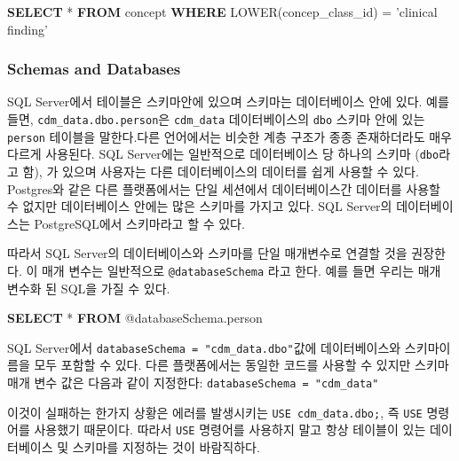 \documentclass[11pt]{book}
\newenvironment{Shaded}{\begin{snugshade}}{\end{snugshade}}
\newcommand{\KeywordTok}[1]{\textcolor[rgb]{0.13,0.29,0.53}{\textbf{#1}}}
\newcommand{\StringTok}[1]{\textcolor[rgb]{0.31,0.60,0.02}{#1}}
\newcommand{\FunctionTok}[1]{\textcolor[rgb]{0.00,0.00,0.00}{#1}}
\newcommand{\NormalTok}[1]{#1}
\theoremstyle{definition}
\theoremstyle{definition}
\theoremstyle{definition}
\theoremstyle{remark}
\begin{document}
\begin{Shaded}
\begin{Highlighting}[]
\KeywordTok{SELECT}\NormalTok{ * }\KeywordTok{FROM}\NormalTok{ concept }\KeywordTok{WHERE} \FunctionTok{LOWER}\NormalTok{(concep_class_id) = }\StringTok{'clinical finding'}
\end{Highlighting}
\end{Shaded}

\subsubsection*{Schemas and Databases}\label{schemas-and-databases}

SQL Server에서 테이블은 스키마안에 있으며 스키마는 데이터베이스 안에
있다. 예를 들면, \texttt{cdm\_data.dbo.person}은 \texttt{cdm\_data}
데이터베이스의 \texttt{dbo} 스키마 안에 있는 \texttt{person} 테이블을
말한다.다른 언어에서는 비슷한 계층 구조가 종종 존재하더라도 매우 다르게
사용된다. SQL Server에는 일반적으로 데이터베이스 당 하나의 스키마
(\texttt{dbo}라고 함), 가 있으며 사용자는 다른 데이터베이스의 데이터를
쉽게 사용할 수 있다. Postgres와 같은 다른 플랫폼에서는 단일 세션에서
데이터베이스간 데이터를 사용할 수 없지만 데이터베이스 안에는 많은
스키마를 가지고 있다. SQL Server의 데이터베이스는 PostgreSQL에서
스키마라고 할 수 있다.

따라서 SQL Server의 데이터베이스와 스키마를 단일 매개변수로 연결할 것을
권장한다. 이 매개 변수는 일반적으로 \texttt{@databaseSchema} 라고 한다.
예를 들면 우리는 매개 변수화 된 SQL을 가질 수 있다.

\begin{Shaded}
\begin{Highlighting}[]
\KeywordTok{SELECT}\NormalTok{ * }\KeywordTok{FROM}\NormalTok{ @databaseSchema.person}
\end{Highlighting}
\end{Shaded}

SQL Server에서 \texttt{databaseSchema\ =\ "cdm\_data.dbo"}값에
데이터베이스와 스키마이름을 모두 포함할 수 있다. 다른 플랫폼에서는
동일한 코드를 사용할 수 있지만 스키마 매개 변수 값은 다음과 같이
지정한다: \texttt{databaseSchema\ =\ "cdm\_data"}

이것이 실패하는 한가지 상황은 에러를 발생시키는
\texttt{USE\ cdm\_data.dbo;}, 즉 \texttt{USE} 명령어를 사용했기
때문이다. 따라서 \texttt{USE} 명령어를 사용하지 말고 항상 테이블이 있는
데이터베이스 및 스키마를 지정하는 것이 바람직하다.
\end{document}
